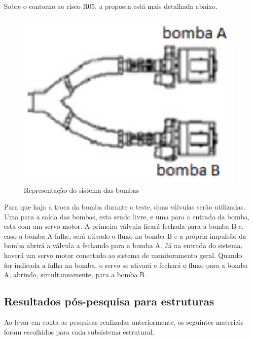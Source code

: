 \newpage

Sobre o contorno ao risco R05, a proposta está mais detalhada abaixo.

\begin{figure}[!htb]                                                               
   \centering                                                                      
   \includegraphics[scale=0.6, keepaspectratio=true]{figuras/conexaobombas.eps} 
   \caption{Representação do sistema das bombas}
\end{figure}

Para que haja a troca da bomba durante o teste, duas válvulas serão utilizadas. Uma para a saída das bombas, esta sendo livre, e uma para a entrada da bomba, esta com um servo motor. A primeira válvula ficará fechada para a bomba B e, caso a bomba A falhe, será ativado o fluxo na bomba B e a própria impulsão da bomba abrirá a válvula a fechando para a bomba A. Já na entrada do sistema, haverá um servo motor conectado ao sistema de monitoramento geral. Quando for indicada a falha na bomba, o servo se ativará e fechará o fluxo para a bomba A, abrindo, simultaneamente, para a bomba B.


\subsection{Resultados pós-pesquisa para estruturas}

Ao levar em conta as pesquisas realizadas anteriormente, os seguintes materiais foram escolhidos para cada subsistema estrutural.

